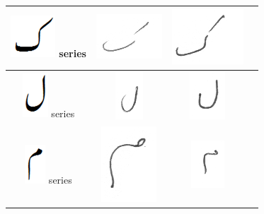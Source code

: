 \begin{table}[h]
\begin{tabular}{@{}cccc@{}}
\hline
\includegraphics[scale=0.15]{kaaf_orig} series & \includegraphics[scale=0.15]{137} & \includegraphics[scale=0.15]{138}  & \\
\hline
\includegraphics[scale=0.15]{Laam_orig} series & \includegraphics[scale=0.15]{139} & \includegraphics[scale=0.15]{140}  &  \\
\hline
\includegraphics[scale=0.15]{meem_orig} series & \includegraphics[scale=0.15]{141} & \includegraphics[scale=0.15]{142}  &  \\

\end{tabular}
\end{table}
